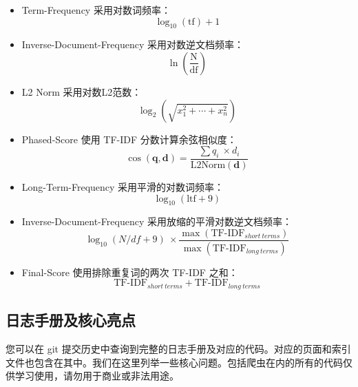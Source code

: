 \documentclass{ctexart}
\begin{document}
\begin{itemize}
    \item Term-Frequency 采用对数词频率： 
    $$\log_{10}(\mathrm{tf})+1$$
    \item Inverse-Document-Frequency 采用对数逆文档频率： 
    $$\ln(\frac{\mathrm{N}}{\mathrm{df}})$$
    \item L2 Norm 采用对数L2范数：
    $$\log_2\left(\sqrt{x_1^2+\cdots+x_n^2}\right)$$
    \item Phased-Score 使用 TF-IDF 分数计算余弦相似度：
    $$\cos(\mathbf{q},\mathbf{d}) = \frac{\sum{q_i\ \times  d_i}} {\mathrm{L2Norm}(\mathbf{d})}$$
    \item Long-Term-Frequency 采用平滑的对数词频率： 
    $$\log_{10}(\mathrm{ltf}+9)$$
    \item Inverse-Document-Frequency 采用放缩的平滑对数逆文档频率： 
    $$\log_{10}(N/df+9)\ \times \frac{ \max( \mathrm{TF\mbox{-}IDF}_{short~terms}) } { \max( \mathrm{TF\mbox{-}IDF}_{long~terms} ) } $$
    \item Final-Score 使用排除重复词的两次 TF-IDF 之和： 
    $$\mathrm{ TF \mbox{-} IDF }_{short~terms} + \mathrm{ TF \mbox{-} IDF }_{long~terms}$$
\end{itemize}



\subsection{日志手册及核心亮点}

您可以在 git 提交历史中查询到完整的日志手册及对应的代码。对应的页面和索引文件也包含在其中。我们在这里列举一些核心问题。包括爬虫在内的所有的代码仅供学习使用，请勿用于商业或非法用途。
\end{document}
